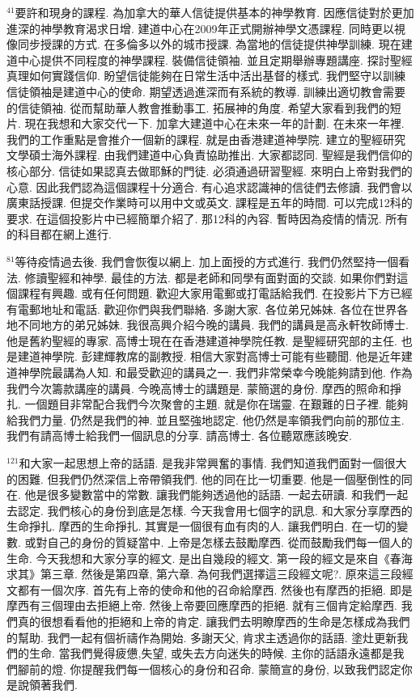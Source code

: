 \documentclass{book}
\begin{document}
$^{41}$要許和現身的課程.
為加拿大的華人信徒提供基本的神學教育.
因應信徒對於更加進深的神學教育渴求日增.
建道中心在2009年正式開辦神學文憑課程.
同時更以視像同步授課的方式.
在多倫多以外的城市授課.
為當地的信徒提供神學訓練.
現在建道中心提供不同程度的神學課程.
裝備信徒領袖.
並且定期舉辦專題講座.
探討聖經真理如何實踐信仰.
盼望信徒能夠在日常生活中活出基督的樣式.
我們堅守以訓練信徒領袖是建道中心的使命.
期望透過進深而有系統的教導.
訓練出適切教會需要的信徒領袖.
從而幫助華人教會推動事工.
拓展神的角度.
希望大家看到我們的短片.
現在我想和大家交代一下.
加拿大建道中心在未來一年的計劃.
在未來一年裡.
我們的工作重點是會推介一個新的課程.
就是由香港建道神學院.
建立的聖經研究文學碩士海外課程.
由我們建道中心負責協助推出.
大家都認同.
聖經是我們信仰的核心部分.
信徒如果認真去做耶穌的門徒.
必須通過研習聖經.
來明白上帝對我們的心意.
因此我們認為這個課程十分適合.
有心追求認識神的信徒們去修讀.
我們會以廣東話授課.
但提交作業時可以用中文或英文.
課程是五年的時間.
可以完成12科的要求.
在這個投影片中已經簡單介紹了.
那12科的內容.
暫時因為疫情的情況.
所有的科目都在網上進行.

$^{81}$等待疫情過去後.
我們會恢復以網上.
加上面授的方式進行.
我們仍然堅持一個看法.
修讀聖經和神學.
最佳的方法.
都是老師和同學有面對面的交談.
如果你們對這個課程有興趣.
或有任何問題.
歡迎大家用電郵或打電話給我們.
在投影片下方已經有電郵地址和電話.
歡迎你們與我們聯絡.
多謝大家.
各位弟兄姊妹.
各位在世界各地不同地方的弟兄姊妹.
我很高興介紹今晚的講員.
我們的講員是高永軒牧師博士.
他是舊約聖經的專家.
高博士現在在香港建道神學院任教.
是聖經研究部的主任.
也是建道神學院.
彭建輝教席的副教授.
相信大家對高博士可能有些聽聞.
他是近年建道神學院最講為人知.
和最受歡迎的講員之一.
我們非常榮幸今晚能夠請到他.
作為我們今次籌款講座的講員.
今晚高博士的講題是.
蒙簡選的身份.
摩西的照命和掙扎.
一個題目非常配合我們今次聚會的主題.
就是你在瑞靈.
在艱難的日子裡.
能夠給我們力量.
仍然是我們的神.
並且堅強地認定.
他仍然是率領我們向前的那位主.
我們有請高博士給我們一個訊息的分享.
請高博士.
各位聽眾應該晚安.

$^{121}$和大家一起思想上帝的話語.
是我非常興奮的事情.
我們知道我們面對一個很大的困難.
但我們仍然深信上帝帶領我們.
他的同在比一切重要.
他是一個壓倒性的同在.
他是很多變數當中的常數.
讓我們能夠透過他的話語.
一起去研讀.
和我們一起去認定.
我們核心的身份到底是怎樣.
今天我會用七個字的訊息.
和大家分享摩西的生命掙扎.
摩西的生命掙扎.
其實是一個很有血有肉的人.
讓我們明白.
在一切的變數.
或對自己的身份的質疑當中.
上帝是怎樣去鼓勵摩西.
從而鼓勵我們每一個人的生命.
今天我想和大家分享的經文.
是出自幾段的經文.
第一段的經文是來自《春海求其》第三章.
然後是第四章, 第六章.
為何我們選擇這三段經文呢?.
原來這三段經文都有一個次序.
首先有上帝的使命和他的召命給摩西.
然後也有摩西的拒絕.
即是摩西有三個理由去拒絕上帝.
然後上帝要回應摩西的拒絕.
就有三個肯定給摩西.
我們真的很想看看他的拒絕和上帝的肯定.
讓我們去明瞭摩西的生命是怎樣成為我們的幫助.
我們一起有個祈禱作為開始.
多謝天父, 肯求主透過你的話語.
塗灶更新我們的生命.
當我們覺得疲憊,失望, 或失去方向迷失的時候.
主你的話語永遠都是我們腳前的燈.
你提醒我們每一個核心的身份和召命.
蒙簡宣的身份, 以致我們認定你是說領著我們.
\end{document}
